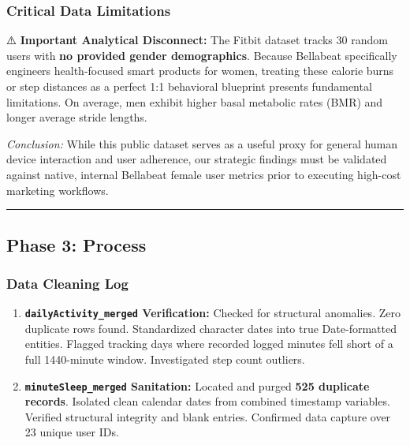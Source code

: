 \documentclass[
]{article}
\providecommand{\tightlist}{%
  \setlength{\itemsep}{0pt}\setlength{\parskip}{0pt}}
\begin{document}
\subsubsection{Critical Data
Limitations}\label{critical-data-limitations}

⚠️ \textbf{Important Analytical Disconnect:} The Fitbit dataset tracks
30 random users with \textbf{no provided gender demographics}. Because
Bellabeat specifically engineers health-focused smart products for
women, treating these calorie burns or step distances as a perfect 1:1
behavioral blueprint presents fundamental limitations. On average, men
exhibit higher basal metabolic rates (BMR) and longer average stride
lengths.

\emph{Conclusion:} While this public dataset serves as a useful proxy
for general human device interaction and user adherence, our strategic
findings must be validated against native, internal Bellabeat female
user metrics prior to executing high-cost marketing workflows.

\begin{center}\rule{0.5\linewidth}{0.5pt}\end{center}

\subsection{Phase 3: Process}\label{phase-3-process}

\subsubsection{Data Cleaning Log}\label{data-cleaning-log}

\begin{enumerate}
\def\labelenumi{\arabic{enumi}.}
\tightlist
\item
  \textbf{\texttt{dailyActivity\_merged} Verification:} Checked for
  structural anomalies. Zero duplicate rows found. Standardized
  character dates into true Date-formatted entities. Flagged tracking
  days where recorded logged minutes fell short of a full 1440-minute
  window. Investigated step count outliers.
\item
  \textbf{\texttt{minuteSleep\_merged} Sanitation:} Located and purged
  \textbf{525 duplicate records}. Isolated clean calendar dates from
  combined timestamp variables. Verified structural integrity and blank
  entries. Confirmed data capture over 23 unique user IDs.
\end{enumerate}
\end{document}
